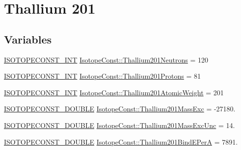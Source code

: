 \hypertarget{group___isotope_const-_thallium-_tl201}{}\section{Thallium 201}
\label{group___isotope_const-_thallium-_tl201}
\subsection*{Variables}
\begin{DoxyCompactItemize}
\item 
\mbox{\hyperlink{group___isotope_const-_macros_ga5f18360b3e99483a35c32d789e62621c}{I\+S\+O\+T\+O\+P\+E\+C\+O\+N\+S\+T\+\_\+\+I\+NT}} \mbox{\hyperlink{group___isotope_const-_thallium-_tl201_ga4c7a8d73bbd28d4f78d9ac61590d877a}{Isotope\+Const\+::\+Thallium201\+Neutrons}} = 120
\item 
\mbox{\hyperlink{group___isotope_const-_macros_ga5f18360b3e99483a35c32d789e62621c}{I\+S\+O\+T\+O\+P\+E\+C\+O\+N\+S\+T\+\_\+\+I\+NT}} \mbox{\hyperlink{group___isotope_const-_thallium-_tl201_gaf86082f0095e6605570dc2731ba828a7}{Isotope\+Const\+::\+Thallium201\+Protons}} = 81
\item 
\mbox{\hyperlink{group___isotope_const-_macros_ga5f18360b3e99483a35c32d789e62621c}{I\+S\+O\+T\+O\+P\+E\+C\+O\+N\+S\+T\+\_\+\+I\+NT}} \mbox{\hyperlink{group___isotope_const-_thallium-_tl201_gacde9abfd8f728161b8b7d65aaffca0e2}{Isotope\+Const\+::\+Thallium201\+Atomic\+Weight}} = 201
\item 
\mbox{\hyperlink{group___isotope_const-_macros_ga8f45a7272ce02c0b4c65c44636ed719a}{I\+S\+O\+T\+O\+P\+E\+C\+O\+N\+S\+T\+\_\+\+D\+O\+U\+B\+LE}} \mbox{\hyperlink{group___isotope_const-_thallium-_tl201_ga746d0a38a9795b89e3d4e7bbc61a0a51}{Isotope\+Const\+::\+Thallium201\+Mass\+Exc}} = -\/27180.
\item 
\mbox{\hyperlink{group___isotope_const-_macros_ga8f45a7272ce02c0b4c65c44636ed719a}{I\+S\+O\+T\+O\+P\+E\+C\+O\+N\+S\+T\+\_\+\+D\+O\+U\+B\+LE}} \mbox{\hyperlink{group___isotope_const-_thallium-_tl201_gad0f26d70a45f14fcc49353141bafc66a}{Isotope\+Const\+::\+Thallium201\+Mass\+Exc\+Unc}} = 14.
\item 
\mbox{\hyperlink{group___isotope_const-_macros_ga8f45a7272ce02c0b4c65c44636ed719a}{I\+S\+O\+T\+O\+P\+E\+C\+O\+N\+S\+T\+\_\+\+D\+O\+U\+B\+LE}} \mbox{\hyperlink{group___isotope_const-_thallium-_tl201_ga01980d4f44974a02da824cf78e881705}{Isotope\+Const\+::\+Thallium201\+Bind\+E\+PerA}} = 7891.
\item 

\end{DoxyCompactItemize}
